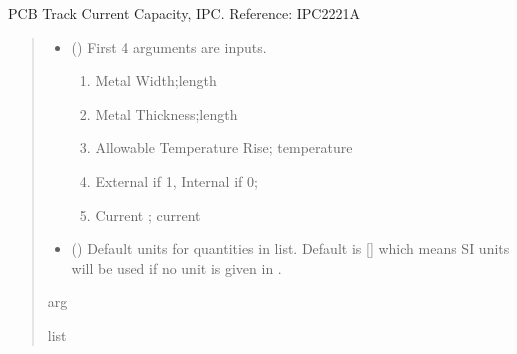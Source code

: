 \documentclass[letterpaper,10pt,english]{sphinxmanual}
\begin{document}

\begin{fulllineitems}
\label{\detokenize{components:components.PCBTrackCurrentCapacityIPC}}
\pysigstartsignatures
{}
\pysigstopsignatures
\sphinxAtStartPar
PCB Track Current Capacity, IPC.
Reference: IPC2221A
\begin{quote}\begin{description}
\begin{itemize}
\item {}
\sphinxAtStartPar
{} () \textendash{}
\sphinxAtStartPar
First 4 arguments are inputs.
\begin{enumerate}
%
\item {}
\sphinxAtStartPar
Metal Width;length

\item {}
\sphinxAtStartPar
Metal Thickness;length

\item {}
\sphinxAtStartPar
Allowable Temperature Rise; temperature

\item {}
\sphinxAtStartPar
External if 1, Internal if 0;

\item {}
\sphinxAtStartPar
Current ; current

\end{enumerate}


\item {}
\sphinxAtStartPar
{} (\sphinxstyleliteralemphasis{\sphinxupquote{, }}) \textendash{} Default units for quantities in  list. Default is {[}{]} which means SI units will be used if no unit is given in .

\end{itemize}

\sphinxAtStartPar
arg

\sphinxAtStartPar
list

\end{description}\end{quote}

\end{fulllineitems}
\end{document}
